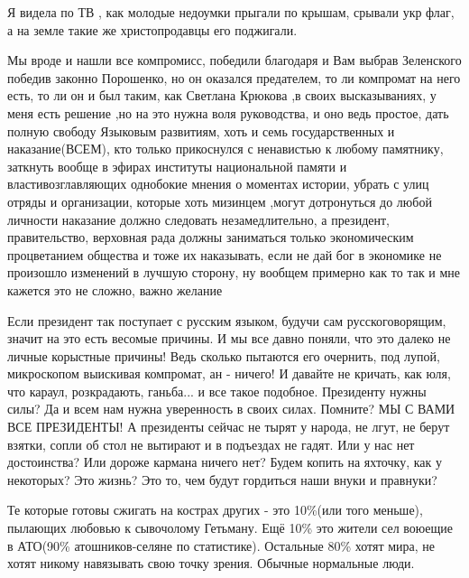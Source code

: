 Я видела по ТВ , как молодые недоумки прыгали по крышам, срывали укр флаг, а на земле такие же христопродавцы его поджигали.


Мы вроде и нашли все компромисс, победили благодаря и Вам выбрав Зеленского
победив законно Порошенко, но он оказался предателем, то ли компромат на него
есть, то ли он и был таким, как Светлана Крюкова ,в своих высказываниях, у меня
есть решение ,но на это нужна воля руководства, и оно ведь простое, дать полную
свободу Языковым развитиям, хоть и семь государственных и наказание(ВСЕМ), кто
только прикоснулся с ненавистью к любому памятнику, заткнуть вообще в эфирах
институты национальной памяти и властивозглавляющих однобокие мнения о моментах
истории, убрать с улиц отряды и организации, которые хоть мизинцем ,могут
дотронуться до любой личности наказание должно следовать незамедлительно, а
президент, правительство, верховная рада должны заниматься только экономическим
процветанием общества и тоже их наказывать, если не дай бог в экономике не
произошло изменений в лучшую сторону, ну вообщем примерно как то так и мне
кажется это не сложно, важно желание


Если президент так поступает с русским языком, будучи сам русскоговорящим,
значит на это есть весомые причины. И мы все давно поняли, что это далеко не
личные корыстные причины! Ведь сколько пытаются его очернить, под лупой,
микроскопом выискивая компромат, ан - ничего! И давайте не кричать, как юля,
что караул, розкрадають, ганьба... и все такое подобное. Президенту нужны силы?
Да и всем нам нужна уверенность в своих силах. Помните? МЫ С ВАМИ ВСЕ
ПРЕЗИДЕНТЫ! А президенты сейчас не тырят у народа, не лгут, не берут взятки,
сопли об стол не вытирают и в подъездах не гадят. Или у нас нет достоинства?
Или дороже кармана ничего нет? Будем копить на яхточку, как у некоторых? Это
жизнь? Это то, чем будут гордиться наши внуки и правнуки?


Те которые готовы сжигать на кострах других - это 10\%(или того меньше), пылающих
любовью к сывочолому Гетьману. Ещё 10\% это жители сел воюещие в АТО(90\%
атошников-селяне по статистике). Остальные 80\% хотят мира, не хотят никому
навязывать свою точку зрения. Обычные нормальные люди.

